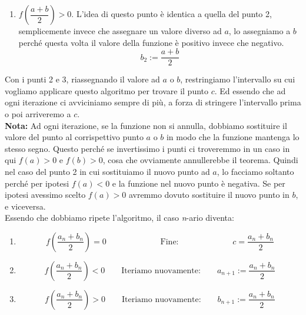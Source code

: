 {\begin{enumerate}
    \item $f\left(\dfrac{a + b}{2}\right) > 0$. L'idea di questo punto è 
      identica a quella del punto 2, semplicemente invece che assegnare un 
      valore diverso ad $a$, lo assegniamo a $b$ perché questa volta il valore 
      della funzione è positivo invece che negativo.
      \begin{equation*}
        b_2 := \dfrac{a+b}{2}
      \end{equation*}
  \end{enumerate}
  Con i punti 2 e 3, riassegnando il valore ad $a$ o $b$, restringiamo 
  l'intervallo su cui vogliamo applicare questo algoritmo per trovare il punto 
  $c$. Ed essendo che ad ogni iterazione ci avviciniamo sempre di più, a forza 
  di stringere l'intervallo prima o poi arriveremo a $c$.\\
  \textbf{Nota:} Ad ogni iterazione, se la funzione non si annulla, dobbiamo 
  sostituire il valore del punto al corrispettivo punto $a$ o $b$ in modo che 
  la funzione mantenga lo stesso segno. Questo perché se invertissimo i punti 
  ci troveremmo in un caso in qui $f(a) > 0$ e $f(b) > 0$, cosa che ovviamente 
  annullerebbe il teorema. Quindi nel caso del punto 2 in cui sostituiamo il 
  nuovo punto ad $a$, lo facciamo soltanto perché per ipotesi $f(a) < 0$ e la 
  funzione nel nuovo punto è negativa. Se per ipotesi avessimo scelto $f(a) > 
  0$ avremmo dovuto sostituire il nuovo punto in $b$, e viceversa.\\

  Essendo che dobbiamo ripete l'algoritmo, il caso \textit{n}-ario diventa:
  \begin{enumerate}
    \item 
      \begin{equation*}
        f\left(\dfrac{a_n + b_n}{2}\right) = 0 \;\; \qquad \qquad \qquad 
        \text{Fine:} \;\; \qquad \qquad \qquad c = \dfrac{a_n + b_n}{2}
      \end{equation*}

    \item 
      \begin{equation*}
        f\left(\dfrac{a_n + b_n}{2}\right) < 0 \qquad \text{Iteriamo 
        nuovamente:} \qquad a_{n + 1}:= \dfrac{a_n + b_n}{2}
      \end{equation*}
      
    \item 
      \begin{equation*}
        f\left(\dfrac{a_n + b_n}{2}\right) > 0 \qquad \text{Iteriamo 
        nuovamente:} \qquad b_{n + 1}:= \dfrac{a_n + b_n}{2}
      \end{equation*}


\end{enumerate}}
